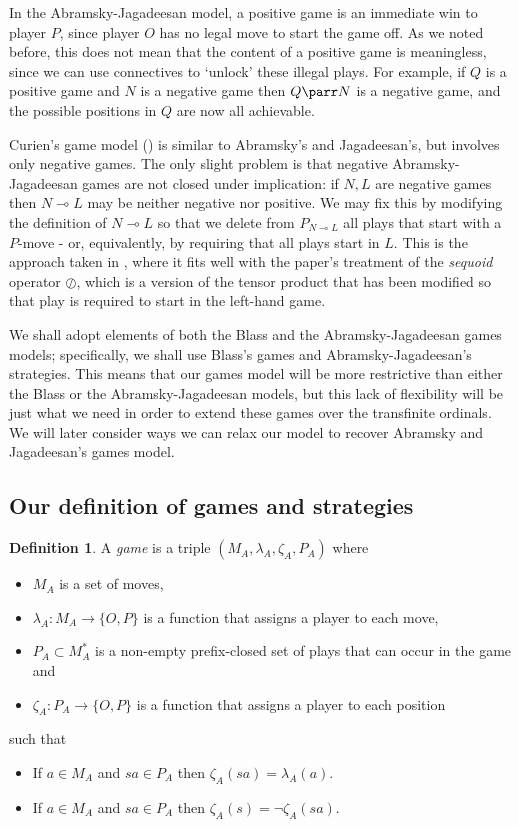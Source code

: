 \documentclass[11pt]{article} %
\theoremstyle{plain} %
\theoremstyle{definition} %
\newtheorem{definition}[theorem]{Definition}
\theoremstyle{exercisestyle}
\newcommand*\from{\colon}
\newcommand{\cmap}[3]{#1\from{}#2\to{}#3}
\newcommand{\sequoid}{\oslash}
\renewcommand{\implies}{\multimap}
\newcommand{\OP}{\{O,P\}}
\begin{document}
In the Abramsky-Jagadeesan model, a positive game is an immediate win to player $P$, since player $O$ has no legal move to start the game off.  As we noted before, this does not mean that the content of a positive game is meaningless, since we can use connectives to `unlock' these illegal plays.  For example, if $Q$ is a positive game and $N$ is a negative game then $Q\parr N$ is a negative game, and the possible positions in $Q$ are now all achievable.  

Curien's game model (\cite{curiengames}) is similar to Abramsky's and Jagadeesan's, but involves only negative games.  The only slight problem is that negative Abramsky-Jagadeesan games are not closed under implication: if $N,L$ are negative games then $N\implies L$ may be neither negative nor positive.  We may fix this by modifying the definition of $N\implies L$ so that we delete from $P_{N\implies L}$ all plays that start with a $P$-move - or, equivalently, by requiring that all plays start in $L$.  This is the approach taken in \cite{martinsthesis}, where it fits well with the paper's treatment of the \emph{sequoid} operator $\sequoid$, which is a version of the tensor product that has been modified so that play is required to start in the left-hand game.

We shall adopt elements of both the Blass and the Abramsky-Jagadeesan games models; specifically, we shall use Blass's games and Abramsky-Jagadeesan's strategies.  This means that our games model will be more restrictive than either the Blass or the Abramsky-Jagadeesan models, but this lack of flexibility will be just what we need in order to extend these games over the transfinite ordinals.  We will later consider ways we can relax our model to recover Abramsky and Jagadeesan's games model.

\subsection{Our definition of games and strategies}

\begin{definition}
  A \emph{game} is a triple $(M_A,\lambda_A,\zeta_A,P_A)$ where
  \begin{itemize}
    \item $M_A$ is a set of moves,
    \item $\cmap{\lambda_A}{M_A}{\OP}$ is a function that assigns a player to each move,
    \item $P_A\subset M_A^*$ is a non-empty prefix-closed set of plays that can occur in the game and
    \item $\cmap{\zeta_A}{P_A}{\OP}$ is a function that assigns a player to each position
  \end{itemize}
  such that
  \begin{itemize}
    \item If $a\in M_A$ and $sa\in P_A$ then $\zeta_A(sa)=\lambda_A(a)$.
    \item If $a\in M_A$ and $sa\in P_A$ then $\zeta_A(s)=\neg\zeta_A(sa)$.
  \end{itemize}
\end{definition}
\end{document}
